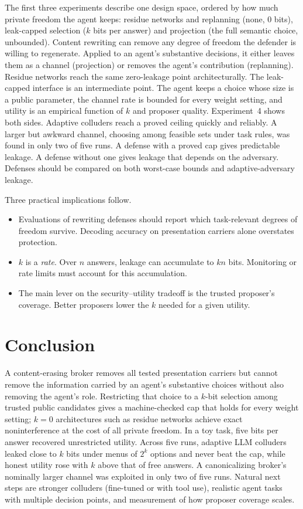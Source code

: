 \documentclass[11pt]{article}
\begin{document}
The first three experiments describe one design space, ordered by how much private
freedom the agent keeps: residue networks and replanning (none, 0 bits),
leak-capped selection ($k$ bits per answer) and projection (the full semantic
choice, unbounded). Content rewriting can remove
any degree of freedom the defender is willing to regenerate. Applied to an
agent's substantive decisions, it either leaves them as a channel (projection)
or removes the agent's contribution (replanning). Residue networks reach the same zero-leakage point
architecturally. The leak-capped interface is an intermediate point. The agent keeps a choice whose size is a public
parameter, the channel rate is bounded for every weight setting, and utility
is an empirical function of $k$ and proposer quality.
Experiment~4 shows both sides. Adaptive colluders reach a proved ceiling
quickly and reliably. A larger but awkward channel, choosing among feasible
sets under task rules, was found in only two of five runs. A defense with a
proved cap gives predictable leakage. A defense without one gives leakage
that depends on the adversary. Defenses should be compared on both
worst-case bounds and adaptive-adversary leakage.

Three practical implications follow.
\begin{itemize}
\item Evaluations of rewriting defenses should report which task-relevant
  degrees of freedom survive. Decoding accuracy on presentation carriers alone
  overstates protection.
\item $k$ is a \emph{rate}. Over $n$ answers, leakage can accumulate to $kn$
  bits. Monitoring or rate limits must account for this accumulation.
\item The main lever on the security--utility tradeoff is the trusted
  proposer's coverage. Better proposers lower the $k$ needed for a given
  utility.
\end{itemize}

\section{Conclusion}

A content-erasing broker removes all tested presentation carriers but cannot
remove the information carried by an agent's substantive choices without also
removing the agent's role. Restricting that choice to a $k$-bit selection
among trusted public candidates gives a machine-checked cap that holds for
every weight setting; $k=0$ architectures such as residue networks achieve
exact noninterference at the cost of all private freedom. In a toy task, five bits per answer recovered
unrestricted utility. Across five runs, adaptive LLM colluders leaked close to $k$ bits under
menus of $2^k$ options and never beat the cap, while honest utility rose
with $k$ above that of free answers. A canonicalizing broker's nominally
larger channel was exploited in only two of five runs. Natural next steps are stronger
colluders (fine-tuned or with tool use),
realistic agent tasks with multiple decision points, and measurement of how
proposer coverage scales.
\end{document}
